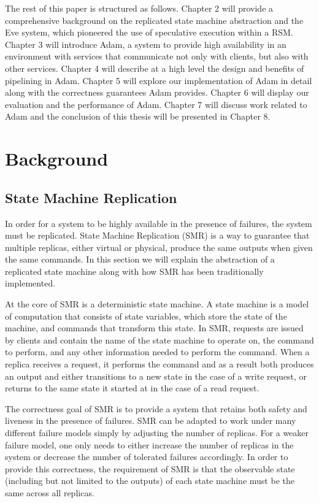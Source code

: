 \documentclass[11pt, oneside]{report}
\begin{document}
The rest of this paper is structured as follows. Chapter 2 will provide a comprehensive background on the replicated state machine abstraction and the Eve system, which pioneered the use of speculative execution within a RSM. Chapter 3 will introduce Adam, a system to provide high availability in an environment with services that communicate not only with clients, but also with other services. Chapter 4 will describe at a high level the design and benefits of pipelining in Adam. Chapter 5 will explore our implementation of Adam in detail along with the correctness guarantees Adam provides. Chapter 6 will display our evaluation and the performance of Adam. Chapter 7 will discuss work related to Adam and the conclusion of this thesis will be presented in Chapter 8.

\chapter{Background}
\section{State Machine Replication}
In order for a system to be highly available in the presence of failures, the system must be replicated. State Machine Replication (SMR) is a way to guarantee that multiple replicas, either virtual or physical, produce the same outputs when given the same commands. In this section we will explain the abstraction of a replicated state machine along with how SMR has been traditionally implemented.

At the core of SMR is a deterministic state machine. A state machine is a model of computation that consists of state variables, which store the state of the machine, and commands that transform this state. In SMR, requests are issued by clients and contain the name of the state machine to operate on, the command to perform, and any other information needed to perform the command. When a replica receives a request, it performs the command and as a result both produces an output and either transitions to a new state in the case of a write request, or returns to the same state it started at in the case of a read request.

The correctness goal of SMR is to provide a system that retains both safety and liveness in the presence of failures. SMR can be adapted to work under many different failure models simply by adjusting the number of replicas. For a weaker failure model, one only needs to either increase the number of replicas in the system or decrease the number of tolerated failures accordingly. In order to provide this correctness, the requirement of SMR is that the observable state (including but not limited to the outputs) of each state machine must be the same across all replicas.
\end{document}
